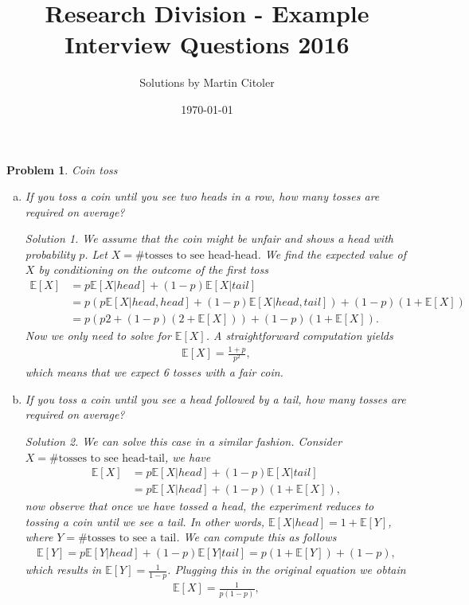 \documentclass[12pt, letterpaper]{amsart}
\title{Research Division - Example Interview Questions 2016}
\author{Solutions by Martin Citoler}
\date{\today}
\numberwithin{equation}{section} %
\newcommand{\E}{\mathbb{E}}
\newtheorem{problem}{Problem}
\theoremstyle{definition}
\theoremstyle{remark}
\newtheorem*{solution}{Solution}
\begin{document}
\maketitle

\begin{problem}
Coin toss
\begin{enumerate}[a.]
\item If you toss a coin until you see two heads in a row, how many tosses are required on average?
\begin{solution}
We assume that the coin might be unfair and shows a head with probability $p$. 
Let $X = \textrm{\# tosses to see  head-head}$. We find the expected value of $X$ by conditioning on the outcome of the first toss 
\begin{align*}
\E [X] &= p \E[X|head] + (1-p)\E[X|tail]\\
    &= p \left(p\E[X|head,head] + (1-p)\E[X|head,tail]\right) + (1-p)\left(1 + \E[X]\right)\\
    &= p \left(p2 + (1-p)\left(2 + \E[X]\right)\right) + (1-p)\left(1 + \E[X]\right).
\end{align*}
Now we only need to solve for $\E[X]$. A straightforward computation yields
\begin{align*}
 \E[X] = \frac{1+p}{p^2},
\end{align*}
which means that we expect 6 tosses with a fair coin.
\end{solution}
\item If you toss a coin until you see a head followed by a tail, how many tosses are required on average?
\begin{solution}
We can solve this case in a similar fashion. Consider $X = \textrm{\# tosses to see  head-tail}$, we have
\begin{align*}
\E [X] &= p \E[X|head] + (1-p)\E[X|tail]\\
    &= p\E[X|head] + (1-p)\left(1 + \E[X]\right),
\end{align*}
now observe that once we have tossed a head, the experiment reduces to tossing a coin until we see a tail. In other words, $\E[X|head] = 1 + \E[Y]$, where $Y = \textrm{\# tosses to see a tail}$. We can compute this as follows
\begin{align*}
\E[Y] = p\E[Y|head] + (1-p)\E[Y|tail] = p(1+\E[Y]) + (1-p),
\end{align*}
which results in $\E[Y]=\frac1{1-p}$. Plugging this in the original equation we obtain
\begin{align*}
 \E[X] = \frac1{p(1-p)},
\end{align*}

\end{solution}
\end{enumerate}
\end{problem}
\end{document}
